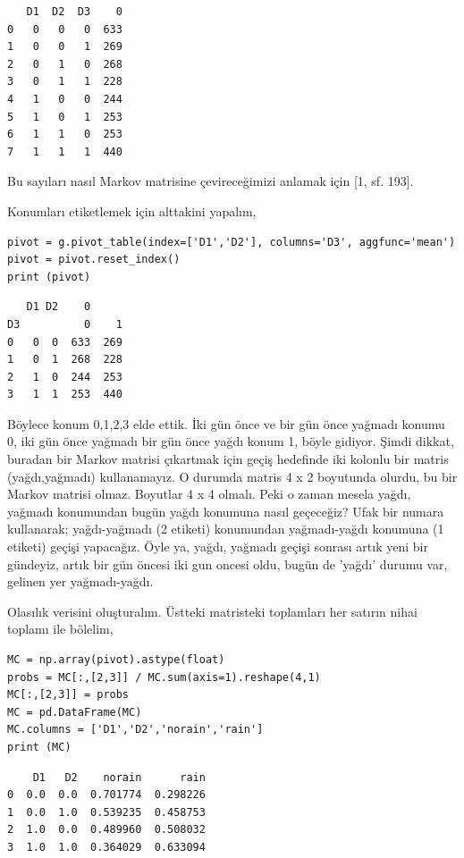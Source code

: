 \documentclass[12pt,fleqn]{article}\usepackage{../../common}
\begin{document}
\begin{verbatim}
   D1  D2  D3    0
0   0   0   0  633
1   0   0   1  269
2   0   1   0  268
3   0   1   1  228
4   1   0   0  244
5   1   0   1  253
6   1   1   0  253
7   1   1   1  440
\end{verbatim}

Bu sayıları nasıl Markov matrisine çevireceğimizi anlamak için [1, sf. 193].

Konumları etiketlemek için alttakini yapalım,

\begin{verbatim}
pivot = g.pivot_table(index=['D1','D2'], columns='D3', aggfunc='mean')
pivot = pivot.reset_index()
print (pivot)
\end{verbatim}

\begin{verbatim}
   D1 D2    0     
D3          0    1
0   0  0  633  269
1   0  1  268  228
2   1  0  244  253
3   1  1  253  440
\end{verbatim}

Böylece konum 0,1,2,3 elde ettik. İki gün önce ve bir gün önce yağmadı konumu 0,
iki gün önce yağmadı bir gün önce yağdı konum 1, böyle gidiyor. Şimdi dikkat,
buradan bir Markov matrisi çıkartmak için geçiş hedefinde iki kolonlu bir matris
(yağdı,yağmadı) kullanamayız. O durumda matris 4 x 2 boyutunda olurdu, bu bir
Markov matrisi olmaz. Boyutlar 4 x 4 olmalı. Peki o zaman mesela yağdı, yağmadı
konumundan bugün yağdı konumuna nasıl geçeceğiz? Ufak bir numara kullanarak;
yağdı-yağmadı (2 etiketi) konumundan yağmadı-yağdı konumuna (1 etiketi) geçişi
yapacağız. Öyle ya, yağdı, yağmadı geçişi sonrası artık yeni bir gündeyiz, artık
bir gün öncesi iki gun oncesi oldu, bugün de 'yağdı' durumu var, gelinen yer
yağmadı-yağdı.

Olasılık verisini oluşturalım. Üstteki matristeki toplamları her satırın nihai
toplamı ile bölelim,

\begin{verbatim}
MC = np.array(pivot).astype(float)
probs = MC[:,[2,3]] / MC.sum(axis=1).reshape(4,1)
MC[:,[2,3]] = probs
MC = pd.DataFrame(MC)
MC.columns = ['D1','D2','norain','rain']
print (MC)
\end{verbatim}

\begin{verbatim}
    D1   D2    norain      rain
0  0.0  0.0  0.701774  0.298226
1  0.0  1.0  0.539235  0.458753
2  1.0  0.0  0.489960  0.508032
3  1.0  1.0  0.364029  0.633094
\end{verbatim}
\end{document}
